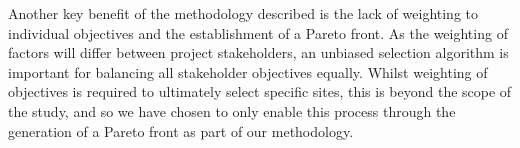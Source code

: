 \documentclass[preprint,12pt]{elsarticle}
\begin{document}
Another key benefit of the methodology described is the lack of weighting to individual objectives and the establishment of a Pareto front. As the weighting of factors will differ between project stakeholders, an unbiased selection algorithm is important for balancing all stakeholder objectives equally. Whilst weighting of objectives is required to ultimately select specific sites, this is beyond the scope of the study, and so we have chosen to only enable this process through the generation of a Pareto front as part of our methodology.

\newpage



 


\end{document}
